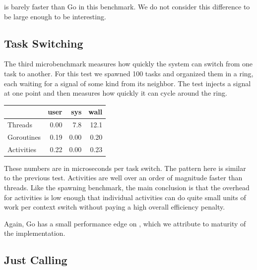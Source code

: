 \documentclass[9pt,preprint]{sigplanconf}
\begin{document}
\charcoal{} is barely faster than Go in this benchmark.
We do not consider this difference to be large enough to be interesting.

\subsection{Task Switching}

The third microbenchmark measures how quickly the system can switch from one task to another.
For this test we spawned 100 tasks and organized them in a ring, each waiting for a signal of some kind from its neighbor.
The test injects a signal at one point and then measures how quickly it can cycle around the ring.

\vspace{1em}
\begin{tabular}{|l|r|r|r|}
  \hline
   & user & sys & wall \\
  \hline
  \hline
  Threads & 0.00 & 7.8 & 12.1 \\
  \hline
  Goroutines & 0.19 & 0.00 & 0.20 \\
  \hline
  Activities & 0.22 & 0.00 & 0.23 \\
  \hline
\end{tabular}
\vspace{1em}

These numbers are in microseconds per task switch.
The pattern here is similar to the previous test.
Activities are well over an order of magnitude faster than threads.
Like the spawning benchmark, the main conclusion is that the overhead for activities is low enough that individual activities can do quite small units of work per context switch without paying a high overall efficiency penalty.

Again, Go has a small performance edge on \charcoal{}, which we attribute to maturity of the implementation.

\subsection{Just Calling}
\end{document}

